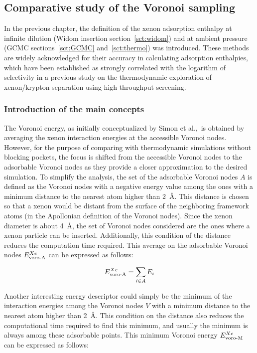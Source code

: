 \documentclass[main]{subfiles}
\begin{document}
\subsection{Comparative study of the Voronoi sampling}

In the previous chapter, the definition of the xenon adsorption enthalpy at infinite dilution (Widom insertion section~\ref{sct:widom}) and at ambient pressure (GCMC sections~\ref{sct:GCMC} and~\ref{sct:thermo}) was introduced. These methods are widely acknowledged for their accuracy in calculating adsorption enthalpies, which have been established as strongly correlated with the logarithm of selectivity in a previous study on the thermodynamic exploration of xenon/krypton separation using high-throughput screening.

\subsubsection{Introduction of the main concepts}

The Voronoi energy, as initially conceptualized by Simon et al.,\ is obtained by averaging the xenon interaction energies at the accessible Voronoi nodes. However, for the purpose of comparing with thermodynamic simulations without blocking pockets, the focus is shifted from the accessible Voronoi nodes to the adsorbable Voronoi nodes as they provide a closer approximation to the desired simulation. To simplify the analysis, the set of the adsorbable Voronoi nodes $A$ is defined as the Voronoi nodes with a negative energy value among the ones with a minimum distance to the nearest atom higher than \SI{2}{\angstrom}. This distance is chosen so that a xenon would be distant from the surface of the neighboring framework atoms (in the Apollonian definition of the Voronoi nodes). Since the xenon diameter is about \SI{4}{\angstrom}, the set of Voronoi nodes considered are the ones where a xenon particle can be inserted. Additionally, this condition of the distance reduces the computation time required. This average on the adsorbable Voronoi nodes $E_{\text{voro-A}}^{Xe}$ can be expressed as follows:

\begin{equation}
    E_{\text{voro-A}}^{Xe} = \sum_{i \in A} E_i
\end{equation}

Another interesting energy descriptor could simply be the minimum of the interaction energies among the Voronoi nodes $V$ with a minimum distance to the nearest atom higher than \SI{2}{\angstrom}. This condition on the distance also reduces the computational time required to find this minimum, and usually the minimum is always among these adsorbable points. This minimum Voronoi energy $E_{\text{voro-M}}^{Xe}$ can be expressed as follows: 
\end{document}
